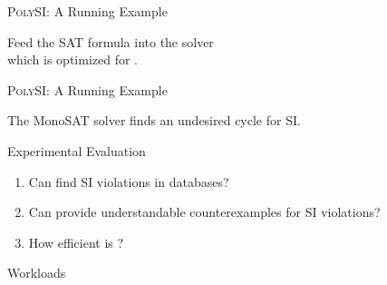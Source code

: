 \begin{frame}{\textsc{PolySI}: A Running Example}
	\begin{center}
		Feed the SAT formula into the  solver~ \\[2pt]
		which is optimized for .

		\vspace{0.20cm}
	\end{center}
\end{frame}

\begin{frame}{\textsc{PolySI}: A Running Example}
	\begin{center}

		\vspace{0.20cm}
		The MonoSAT solver finds an undesired cycle for SI.
	\end{center}
\end{frame}

\begin{frame}{Experimental Evaluation}
	\begin{center}
		\begin{enumerate}[(1)]
			\setlength{\itemsep}{15pt}
			\item {}
			  Can \polysi{} find SI violations in databases?
			\item {}
			  Can \polysi{} provide understandable counterexamples for SI violations?
			\item {}
			  How efficient is \polysi?
		\end{enumerate}

	\end{center}
\end{frame}

\begin{frame}{Workloads}
	\begin{center}
		{}
	\end{center}
\end{frame}

